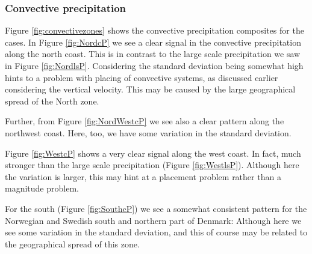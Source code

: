 \subsubsection{Convective precipitation}

Figure \ref{fig:convectivezones} shows the convective precipitation composites for the cases. In Figure \ref{fig:NordcP} we see a clear signal in the convective precipitation along the north coast. This is in contrast to the large scale precipitation we saw in Figure \ref{fig:NordlsP}. Considering the standard deviation being somewhat high hints to a problem with placing of convective systems, as discussed earlier considering the vertical velocity. This may be caused by the large geographical spread of the North zone.

Further, from Figure \ref{fig:NordWestcP} we see also a clear pattern along the northwest coast. Here, too, we have some variation in the standard deviation. 

Figure \ref{fig:WestcP} shows a very clear signal along the west coast. In fact, much stronger than the large scale precipitation (Figure \ref{fig:WestlsP}). Although here the variation is larger, this may hint at a placement problem rather than a magnitude problem. 

For the south (Figure \ref{fig:SouthcP}) we see a somewhat consistent pattern for the Norwegian and Swedish south and northern part of Denmark: Although here we see some variation in the standard deviation, and this of course may be related to the geographical spread of this zone.

